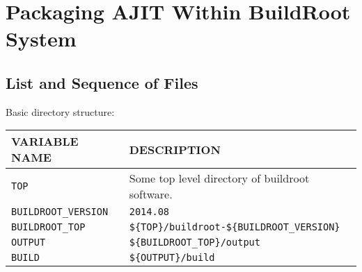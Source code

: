 \chapter{Packaging AJIT Within BuildRoot System}
\label{chap:amv:packaging:work}

\section{List and Sequence of Files}
\label{sec:packaging:config:list:seq}

Basic directory structure:

\begin{tabular}[h]{|p{}|p{}|}
  \hline
  \textbf{VARIABLE NAME} & \textbf{DESCRIPTION} \\
  \hline
  \texttt{TOP} & Some top level directory of buildroot software.\\
  \texttt{BUILDROOT\_VERSION} & \texttt{2014.08}\\
  \texttt{BUILDROOT\_TOP} & \texttt{\$\{TOP\}/buildroot-\$\{BUILDROOT\_VERSION\}}\\
  \texttt{OUTPUT} & \texttt{\$\{BUILDROOT\_TOP\}/output}\\
  \texttt{BUILD} & \texttt{\$\{OUTPUT\}/build}\\
  \hline
\end{tabular}

